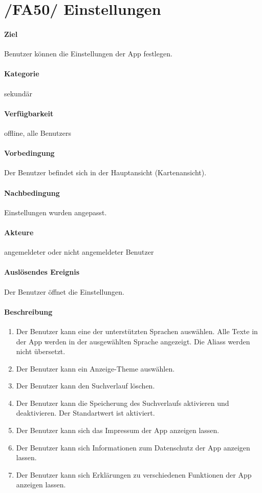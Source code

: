 \section[Einstellungen]{/FA50/ Einstellungen}
\label{/FA50/}
\paragraph{Ziel}
\Gls{Benutzer} können die Einstellungen der App festlegen.
\paragraph{Kategorie}
sekundär
\paragraph{Verfügbarkeit}
\gls{offline}, alle \Glspl{Benutzer}
\paragraph{Vorbedingung}
Der \Gls{Benutzer} befindet sich in der Hauptansicht (\Gls{Kartenansicht}).
\paragraph{Nachbedingung}
Einstellungen wurden angepasst.
\paragraph{Akteure}
angemeldeter oder nicht angemeldeter \Gls{Benutzer}
\paragraph{Auslösendes Ereignis}
Der \Gls{Benutzer} öffnet die Einstellungen.
\paragraph{Beschreibung}
\begin{enumerate}[start=51, label=\textbf{/FA\arabic*/}, align=left]
    \item Der \Gls{Benutzer} kann eine der unterstützten Sprachen auswählen. Alle Texte in der App werden in der ausgewählten Sprache angezeigt. Die \Glspl{Alias} werden nicht übersetzt.
    \item Der \Gls{Benutzer} kann ein Anzeige-\Gls{Theme} auswählen.
    \item Der \Gls{Benutzer} kann den \Gls{Suchverlauf} löschen.
    \item Der \Gls{Benutzer} kann die Speicherung des \Gls{Suchverlauf}s aktivieren und deaktivieren. Der Standartwert ist \dq aktiviert\dq{}.
    \item Der \Gls{Benutzer} kann sich das Impressum der App anzeigen lassen.
    \item Der \Gls{Benutzer} kann sich Informationen zum Datenschutz der App anzeigen lassen.
    \item Der \Gls{Benutzer} kann sich Erklärungen zu verschiedenen Funktionen der App anzeigen lassen.
\end{enumerate}